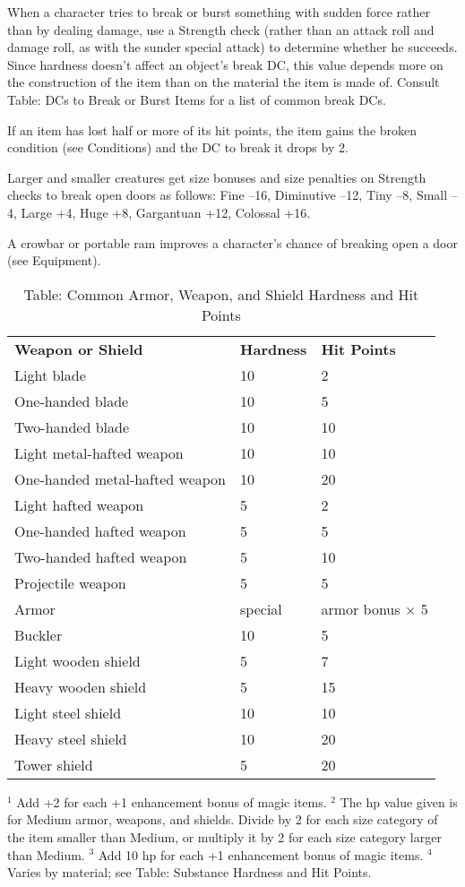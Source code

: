 			
When a character tries to break or burst something with sudden force rather than by dealing damage, use a Strength check (rather than an attack roll and damage roll, as with the sunder special attack) to determine whether he succeeds. Since hardness doesn't affect an object's break DC, this value depends more on the construction of the item than on the material the item is made of. Consult Table: DCs to Break or Burst Items for a list of common break DCs.
			
If an item has lost half or more of its hit points, the item gains the broken condition (see Conditions) and the DC to break it drops by 2.
			
Larger and smaller creatures get size bonuses and size penalties on Strength checks to break open doors as follows: Fine --16, Diminutive --12, Tiny --8, Small --4, Large +4, Huge +8, Gargantuan +12, Colossal +16.
			
A crowbar or portable ram improves a character's chance of breaking open a door (see Equipment).

\begin{table}[]
\caption{Table: Common Armor, Weapon, and Shield Hardness and Hit Points}
\begin{tabular}{lll}
\textbf{Weapon or Shield} & \textbf{Hardness} & \textbf{Hit Points}\\
Light blade & 10 & 2 \\
 One-handed blade & 10 & 5 \\
 Two-handed blade & 10 & 10 \\
 Light metal-hafted weapon & 10 & 10 \\
 One-handed metal-hafted weapon & 10 & 20 \\
 Light hafted weapon & 5 & 2 \\
 One-handed hafted weapon & 5 & 5 \\
 Two-handed hafted weapon & 5 & 10 \\
 Projectile weapon & 5 & 5 \\
 Armor & special & armor bonus × 5 \\
 Buckler & 10 & 5 \\
 Light wooden shield & 5 & 7 \\
 Heavy wooden shield & 5 & 15 \\
 Light steel shield & 10 & 10 \\
 Heavy steel shield & 10 & 20 \\
 Tower shield & 5 & 20\\
\end{tabular}
\(^{1}\) Add +2 for each +1 enhancement bonus of magic items.
\(^{2}\) The hp value given is for Medium armor, weapons, and shields. Divide by 2 for each size category of the item smaller than Medium, or multiply it by 2 for each size category larger than Medium.
\(^{3}\) Add 10 hp for each +1 enhancement bonus of magic items.
\(^{4}\) Varies by material; see Table: Substance Hardness and Hit Points.
					
\end{table}
        	
